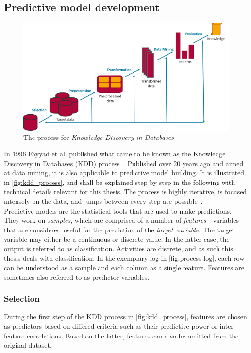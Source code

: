 \subsection{Predictive model development}
\label{sec:predictive-model-development}
\begin{figure}
	\centering
	\includegraphics[width=\textwidth]{gfx/kdd_process.png}
	\caption{The process for \textit{Knowledge Discovery in Databases}~\cite{fayyad1996data}}
	\label{fig:kdd_process}
\end{figure}
In 1996 Fayyad et al. published what came to be known as the Knowledge Discovery in Databases (KDD) process~\cite{fayyad1996data}. Published over 20 years ago and aimed at data mining, it is also applicable to predictive model building. It is illustrated in \autoref{fig:kdd_process}, and shall be explained step by step in the following with technical details relevant for this thesis. The process is highly iterative, is focused intensely on the data, and jumps between every step are possible~\cite{kuhn2013applied}.\\

Predictive models are the statistical tools that are used to make predictions. They work on \textit{samples}, which are comprised of a number of \textit{features} - variables that are considered useful for the prediction of the \textit{target variable}. The target variable may either be a continuous or discrete value. In the latter case, the output is referred to as classification. Activities are discrete, and as such this thesis deals with classification. In the exemplary log in \autoref{fig:process-log}, each row can be understood as a sample and each column as a single feature. Features are sometimes also referred to as predictor variables.

\subsubsection*{Selection}
During the first step of the KDD process in \autoref{fig:kdd_process}, features are chosen as predictors based on differed criteria such as their predictive power or inter-feature correlations. Based on the latter, features can also be omitted from the original dataset.

